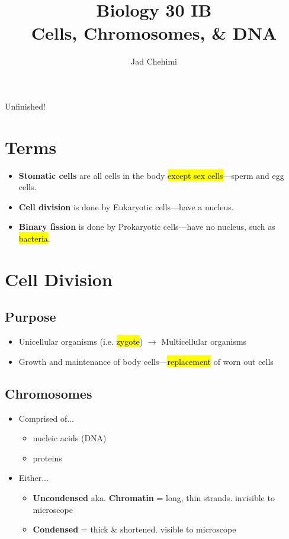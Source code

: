 \documentclass[a4paper,12pt]{article}
\title{Biology 30 IB \\ Cells, Chromosomes, \& DNA}
\author{Jad Chehimi}
\begin{document}
\maketitle

\begin{center}
\Huge
Unfinished!
\normalsize
\end{center}

\tableofcontents

\pagebreak

\section{Terms}
\begin{itemize}
    \item{\textbf{Stomatic cells} are all cells in the body \hl{except sex cells}---sperm and egg cells.}
    \item{\textbf{Cell division} is done by Eukaryotic cells---have a nucleus.}
    \item{\textbf{Binary fission} is done by Prokaryotic cells---have no nucleus, such as \hl{bacteria}.}
\end{itemize}

\section{Cell Division}
\subsection{Purpose}
\begin{itemize}
    \item{Unicellular organisms (i.e. \hl{zygote}) $\longrightarrow$ Multicellular organisms}
    \item{Growth and maintenance of body cells---\hl{replacement} of worn out cells}
\end{itemize}

\subsection{Chromosomes}
\begin{itemize}
    \item{
            Comprised of...
            \begin{itemize}
                \item{nucleic acids (DNA)}
                \item{proteins}
            \end{itemize}
        }
    \item{
            Either...
            \begin{itemize}
                \item{\textbf{Uncondensed} aka. \textbf{Chromatin} = long, thin strands. invisible to microscope}
                \item{\textbf{Condensed} = thick \& shortened. visible to microscope}
            \end{itemize}
        }
\end{itemize}
\end{document}
